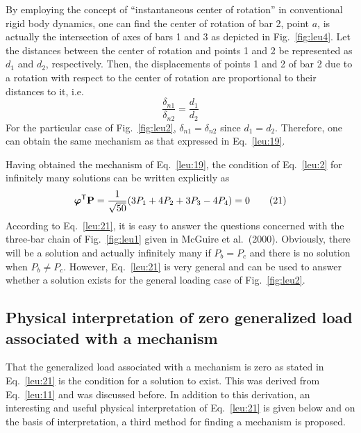 By employing the concept of ``instantaneous center of rotation'' in conventional rigid body dynamics, one can find the center of rotation of bar 2, point $a$, is actually the intersection of axes of bars 1 and 3 as depicted in Fig.~\ref{fig:leu4}. Let the distances between the center of rotation and points 1 and 2 be represented as $d_1$ and $d_2$, respectively. Then, the displacements of points 1 and 2 of bar 2 due to a rotation with respect to the center of rotation are proportional to their distances to it, i.e.
\begin{equation}
  \frac{\delta_{n1}}{\delta_{n2}} = \frac{d_1}{d_2} \tag{20}\label{leu:20}
\end{equation}
For the particular case of Fig.~\ref{fig:leu2}, $\delta_{n1} = \delta_{n2}$ since $d_1 = d_2$. Therefore, one can obtain the same mechanism as that expressed in Eq.~\eqref{leu:19}.

Having obtained the mechanism of Eq.~\eqref{leu:19}, the condition of Eq.~\eqref{leu:2} for infinitely many solutions can be written explicitly as
\begin{equation}
  \bm{\varphi}^{\mathsf{T}}\mathbf{P} = \frac{1}{\sqrt{50}}(3P_1 + 4P_2 + 3P_3 - 4P_4) = 0 \tag{21}\label{leu:21}
\end{equation}
According to Eq.~\eqref{leu:21}, it is easy to answer the questions concerned with the three-bar chain of Fig.~\ref{fig:leu1} given in McGuire et al.\ (2000). Obviously, there will be a solution and actually infinitely many if $P_b = P_c$ and there is no solution when $P_b\neq P_c$. However, Eq.~\eqref{leu:21} is very general and can be used to answer whether a solution exists for the general loading case of Fig.~\ref{fig:leu2}.

\subsection*{Physical interpretation of zero generalized load associated with a mechanism}
That the generalized load associated with a mechanism is zero as stated in Eq.~\eqref{leu:21} is the condition for a solution to exist. This was derived from Eq.~\eqref{leu:11} and was discussed before. In addition to this derivation, an interesting and useful physical interpretation of Eq.~\eqref{leu:21} is given below and on the basis of interpretation, a third method for finding a mechanism is proposed.

